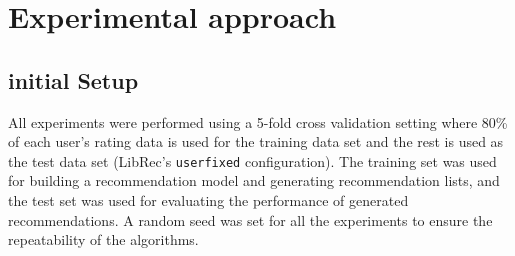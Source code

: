         
        
    
    

        
        
            


\section{Experimental approach}
    
    \subsection{initial Setup}
    
    All experiments were performed using a 5-fold cross validation setting where 80\% of each user's rating data is used for the training data set and the rest is used as the test data set (LibRec's \texttt{userfixed} configuration). The training set was used for building a recommendation model and generating recommendation lists, and the test set was used for evaluating
    the performance of generated recommendations. A random seed was set for all the experiments to ensure the repeatability of the algorithms.
    
